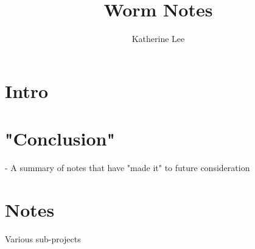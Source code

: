 \documentclass[11pt]{article}
\title{Worm Notes}
\author{Katherine Lee}
\begin{document}
\maketitle

\section{Intro}
\section{"Conclusion"}
- A summary of notes that have "made it" to future consideration

\section{Notes}
Various sub-projects

\end{document}
